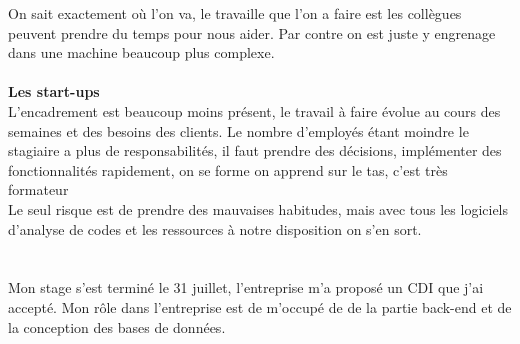 On sait exactement où l'on va, le travaille que l'on a faire est les collègues peuvent prendre du temps pour nous aider. Par contre on est juste y engrenage dans une machine beaucoup plus complexe.
\\ \\
\textbf{Les start-ups}
\\
L'encadrement est beaucoup moins présent, le travail à faire évolue au cours des semaines et des besoins des clients. Le nombre d'employés étant moindre le stagiaire a plus de responsabilités, il faut prendre des décisions, implémenter des fonctionnalités rapidement, on se forme on apprend sur le tas, c'est très formateur \\
Le seul risque est de prendre des mauvaises habitudes, mais avec tous les logiciels d'analyse de codes et les ressources à notre disposition on s'en sort.
\\
\\
\\

Mon stage s'est terminé le 31 juillet, l'entreprise m'a proposé un CDI que j'ai accepté. Mon rôle dans l'entreprise est de m'occupé de de la partie back-end et de la conception des bases de données.   

 